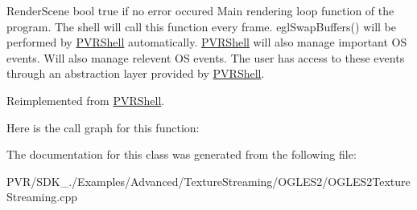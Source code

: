   Render\+Scene  bool true if no error occured  Main rendering loop function of the program. The shell will call this function every frame. egl\+Swap\+Buffers() will be performed by \hyperlink{class_p_v_r_shell}{P\+V\+R\+Shell} automatically. \hyperlink{class_p_v_r_shell}{P\+V\+R\+Shell} will also manage important O\+S events. Will also manage relevent O\+S events. The user has access to these events through an abstraction layer provided by \hyperlink{class_p_v_r_shell}{P\+V\+R\+Shell}. 

Reimplemented from \hyperlink{class_p_v_r_shell_ae0eb5f797cbe993a22b8659f9c332578}{P\+V\+R\+Shell}.



Here is the call graph for this function\+:




The documentation for this class was generated from the following file\+:\begin{DoxyCompactItemize}
\item 
P\+V\+R/\+S\+D\+K\+\_./\+Examples/\+Advanced/\+Texture\+Streaming/\+O\+G\+L\+E\+S2/O\+G\+L\+E\+S2\+Texture\+Streaming.\+cpp\end{DoxyCompactItemize}
